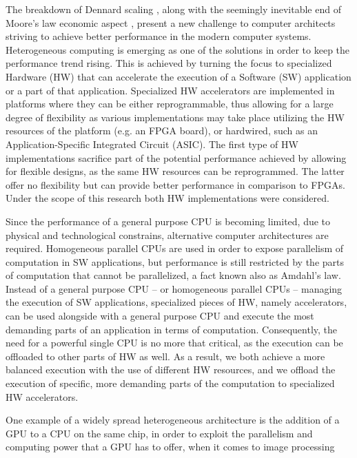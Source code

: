 \documentclass[]{usiinfthesis}
\begin{document}
The breakdown of Dennard scaling \cite{esmaeilzadeh2011dark}, along with the seemingly inevitable 
end of Moore's law economic aspect \cite{simonite2016moore}, present a new challenge to computer 
architects striving to achieve
better performance in the modern computer systems.
Heterogeneous computing is emerging as one of the solutions in order to keep the performance 
trend rising. This is achieved by turning the focus to specialized Hardware (HW) that 
can accelerate the execution of a Software (SW) application or a part of that application. Specialized HW 
accelerators are implemented in platforms where they can be either reprogrammable, 
thus allowing for a large degree of flexibility as various implementations may take place utilizing
the HW resources of the platform (e.g. an FPGA board), or hardwired, such as an Application-Specific Integrated 
Circuit (ASIC). The first type of HW implementations sacrifice part of the potential 
performance achieved by allowing for flexible designs, as the same HW resources can be reprogrammed.
The latter offer no flexibility but can provide better performance in comparison to FPGAs. Under 
the scope of this research both HW implementations were considered.  \par
%
%
Since the performance of a general purpose CPU is becoming limited, due to physical and technological 
constrains, alternative computer architectures are required. Homogeneous parallel CPUs are used in 
order to expose parallelism of computation in SW applications, but performance is still restricted 
by the parts of computation that cannot be parallelized, a fact known also as Amdahl's law.
Instead of a 
general purpose CPU -- or homogeneous parallel CPUs -- managing the execution of SW applications, 
specialized pieces
of HW, namely accelerators, can be used alongside with a general purpose CPU and execute the
most demanding parts of an application in terms of computation. Consequently, the need for 
a powerful single CPU is no more that critical, as the execution can be offloaded to other
parts of HW as well. %
As a result, we both achieve a more balanced execution with 
the use of different HW resources, and we offload the execution of specific, more demanding 
parts of the computation to specialized HW accelerators.\par
One example of a widely spread 
heterogeneous architecture is the addition of a GPU to a CPU on the same chip, in order 
to exploit the
parallelism and computing power that a GPU has to offer, when it comes to image processing 
\end{document}
